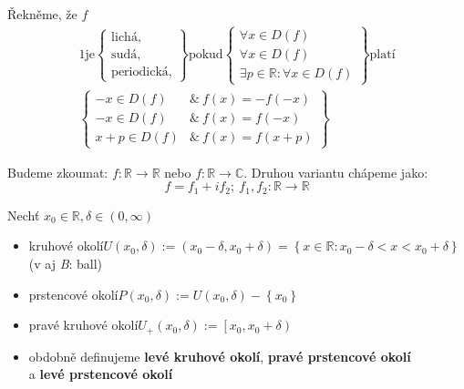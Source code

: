 \begin{definition}[name=Symetrie funkce, label=D-symetry]
    Řekněme, že $f$
    \begin{alignat}{1}
        \text{je}\left.
        \begin{cases}
            \text{lichá,} \\
            \text{sudá,} \\
            \text{periodická,}
        \end{cases}
        \right\} \text{pokud}\left.
        \begin{cases}
            \forall x\in D(f) \\
            \forall x\in D(f) \\
            \exists p\in\mathbb{R}:\forall x\in D(f)
        \end{cases}
        \right\} \text{platí} \nonumber\\
        \left.
        \begin{cases}
            -x\in D(f)&\&~f(x)=-f(-x) \\
            -x\in D(f)&\&~f(x)=f(-x) \\
            x+p\in D(f)&\&~f(x)=f(x+p) 
        \end{cases}
        \right\}
    \end{alignat}
\end{definition}

Budeme zkoumat: $f:\mathbb{R}\rightarrow\mathbb{R}$ nebo $f:\mathbb{R}\rightarrow\mathbb{C}$.
Druhou variantu chápeme jako:
\begin{equation}
    f=f_1+if_2;~f_1,f_2:\mathbb{R}\rightarrow\mathbb{R}
\end{equation}

\begin{definition}[name=Okolí, label=D-neighbourhood]
    Nechť $x_0\in\mathbb{R}, \delta\in(0,\infty)$
    \begin{itemize}
        \item kruhové okolí\quad $U(x_0,\delta):=(x_0-\delta, x_0+\delta)=
            \left\{x\in\mathbb{R}:x_0-\delta<x<x_0+\delta\right\}$ \\
        (v aj \textit{B}: ball)
        \item prstencové okolí\quad $P(x_0,\delta):=U(x_0,\delta)-\left\{x_0\right\}$
        \item pravé kruhové okolí\quad $U_+(x_0,\delta):=\left[x_0,x_0+\delta\right)$
        \item obdobně definujeme \textbf{levé kruhové okolí}, \textbf{pravé prstencové okolí} \\
            a \textbf{levé prstencové okolí}
    \end{itemize}
\end{definition}

